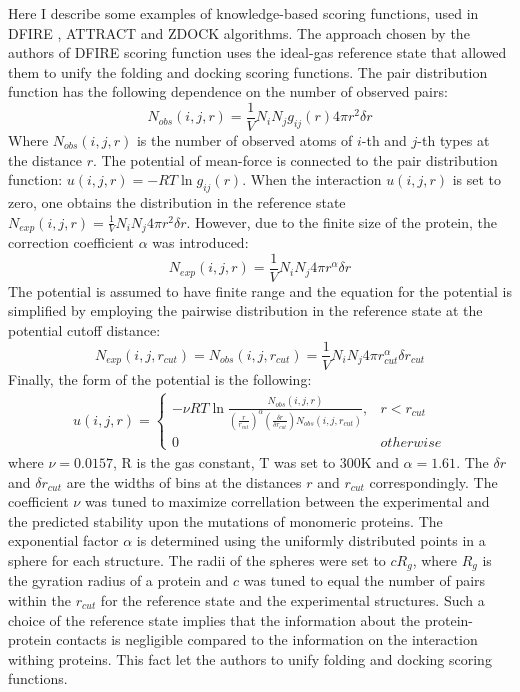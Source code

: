 Here I describe some examples of knowledge-based scoring functions, used in DFIRE \cite{zhou2002distance}, ATTRACT \cite{zacharias2003protein} and ZDOCK \cite{mintseris2007integrating} algorithms.
The approach chosen by the authors of DFIRE scoring function uses the ideal-gas reference state that allowed them to unify the folding and docking scoring functions.
The pair distribution function has the following dependence on the number of observed pairs:
\begin{equation*}
 N_{obs}(i,j,r)=\frac{1}{V}N_i N_j g_{ij}(r) 4\pi r^2 \delta r
\end{equation*}
Where $N_{obs}(i,j,r)$ is the number of observed atoms of $i$-th and $j$-th types at the distance $r$.
The potential of mean-force is connected to the pair distribution function: $u(i,j,r)=-RT \ln g_{ij}(r)$. When the interaction $u(i,j,r)$ is set to zero,
one obtains the distribution in the reference state $N_{exp}(i,j,r)=\frac{1}{V}N_i N_j 4\pi r^2 \delta r$.
However, due to the finite size of the protein, the correction coefficient $\alpha$ was introduced:
\begin{equation*}
 N_{exp}(i,j,r)=\frac{1}{V}N_i N_j 4\pi r^\alpha \delta r
\end{equation*}
The potential is assumed to have finite range and the equation for the potential is simplified by employing the pairwise distribution in the reference state at the potential cutoff distance:
\begin{equation*}
 N_{exp}(i,j,r_{cut})=N_{obs}(i,j,r_{cut})=\frac{1}{V}N_i N_j 4\pi r_{cut}^\alpha \delta r_{cut}
\end{equation*}
Finally, the form of the potential is the following:
\begin{eqnarray*}
 u(i,j,r)=\begin{cases}
                  -\nu R T \ln \frac{N_{obs}(i,j,r) }{\left(\frac{r}{r_{cut}} \right)^\alpha \left(\frac{\delta r}{\delta r_{cut}} \right) N_{obs}(i,j,r_{cut}) }, & r<r_{cut}\\
                  0 & otherwise
                 \end{cases}
\end{eqnarray*}
where $\nu = 0.0157$, R is the gas constant, T was set to 300K and $\alpha=1.61$. 
The $\delta r$ and $\delta r_{cut}$ are the widths of bins at the distances $r$ and $r_{cut}$ correspondingly. 
The coefficient $\nu$ was tuned to maximize correllation
between the experimental and the predicted stability upon the mutations of monomeric proteins. The exponential factor $\alpha$ is determined using the uniformly distributed
points in a sphere for each structure. The radii of the spheres were set to $cR_g$, where $R_g$ is the gyration radius of a protein and $c$ was tuned to equal the number of
pairs within the $r_{cut}$ for the reference state and the experimental structures.
Such a choice of the reference state implies that the information about the protein-protein contacts is negligible compared to the information on the interaction
withing proteins. This fact let the authors to unify folding and docking scoring functions.

